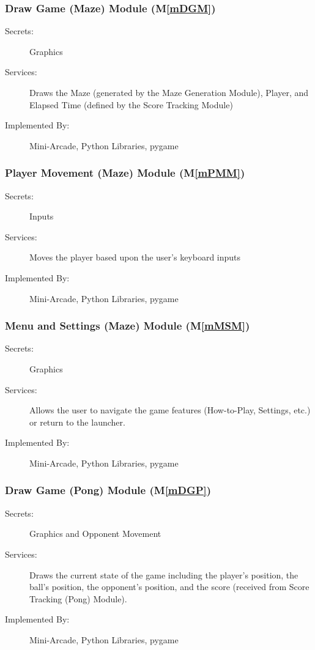 \documentclass[12pt, titlepage]{article}
\newcommand{\mref}[1]{M\ref{#1}}
\begin{document}
\subsubsection{Draw Game (Maze) Module (\mref{mDGM})}
\begin{description}
\item[Secrets:] Graphics
\item[Services:] Draws the Maze (generated by the Maze Generation Module), Player, and Elapsed Time (defined by the Score Tracking Module) 
\item[Implemented By:] Mini-Arcade, Python Libraries, pygame
\end{description}

\subsubsection{Player Movement (Maze) Module (\mref{mPMM})}
\begin{description}
\item[Secrets:] Inputs
\item[Services:] Moves the player based upon the user's keyboard inputs
\item[Implemented By:] Mini-Arcade, Python Libraries, pygame
\end{description}

\subsubsection{Menu and Settings (Maze) Module (\mref{mMSM})}
\begin{description}
\item[Secrets:] Graphics
\item[Services:] Allows the user to navigate the game features (How-to-Play, Settings, etc.) or return to the launcher.
\item[Implemented By:] Mini-Arcade, Python Libraries, pygame
\end{description}

\subsubsection{Draw Game (Pong) Module (\mref{mDGP})}
\begin{description}
\item[Secrets:] Graphics and Opponent Movement
\item[Services:] Draws the current state of the game including the player's position, the ball's position, the opponent's position, and the score (received from Score Tracking (Pong) Module).
\item[Implemented By:] Mini-Arcade, Python Libraries, pygame
\end{description}
\end{document}
